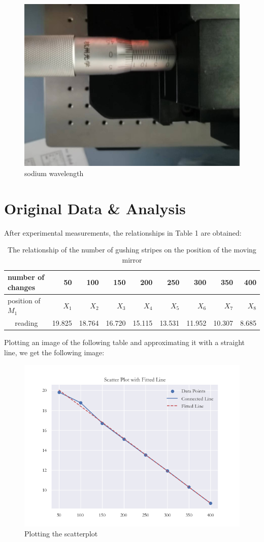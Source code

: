 \documentclass[UTF8]{article}
\begin{document}
 \begin{figure}[h]
     \centering
     \includegraphics[width=0.5\linewidth]{FIG8.jpg}
     \caption{sodium wavelength}
     \label{fig:enter-label}
 \end{figure}

 
	\section{Original Data \& Analysis}
After experimental measurements, the relationships in Table 1 are obtained:\\

\begin{table}[H]
  \centering
  \caption{The relationship of the number of gushing stripes on the position of the moving mirror}
    \begin{tabular}{crrrrrrrr}
    \toprule[2pt]
    \multicolumn{1}{l}{number of changes} & 50 & 100 & 150 & 200 & 250 & 300 & 350 & 400  \\
    \midrule
    \multicolumn{1}{l}{position of $M_1$} & $X_1$ & $X_2$ & $X_3$ & $X_4$ & $X_5$ & $X_6$ & $X_7$ & $X_8$  \\
    reading& 19.825 & 18.764 & 16.720 & 15.115 & 13.531 & 11.952 & 10.307 & 8.685 \\
    \bottomrule[2pt]
    \end{tabular}%
  \label{tab:addlabel}%
\end{table}%

Plotting an image of the following table and approximating it with a straight line, we get the following image:\\

\begin{figure}[h]
    \centering
    \includegraphics[width=0.9\linewidth]{FIG9.png}
    \caption{Plotting the scatterplot}
    \label{fig:enter-label}
\end{figure}
\end{document}

